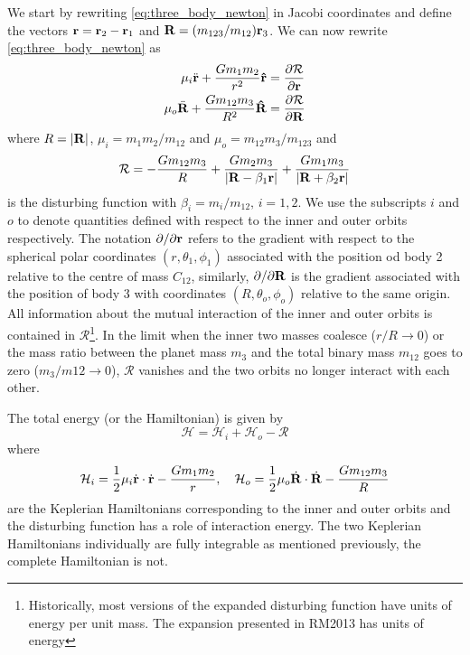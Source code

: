 \documentclass[twoside,openright,titlepage,numbers=noenddot,headinclude,%
                footinclude=true,cleardoublepage=empty,abstractoff, 
                BCOR=5mm,paper=a4,fontsize=11pt,%
                american,%
                ]{scrreprt}%
\begin{document}
We start by rewriting \cref{eq:three_body_newton} in Jacobi coordinates
and define the vectors $\boldsymbol{\mathbf{r}}=\boldsymbol{\mathbf{r}}_2-\boldsymbol{\mathbf{r}}_1$ and 
$\boldsymbol{\mathbf{R}}= (m_{123}/m_{12})\boldsymbol{\mathbf{r}}_3$.
We can now rewrite \cref{eq:three_body_newton} as
\begin{equation}
\begin{aligned}
    \mu_i\ddot{\boldsymbol{\mathbf{r}}}+ \frac{Gm_1m_2}{r^2} \boldsymbol{\mathbf{\hat r}}&= \frac{
        \partial \mathcal{R}}{\partial \boldsymbol{\mathbf{r}}} \\
    \mu_o\ddot{\boldsymbol{\mathbf{R}}}+ \frac{Gm_{12}m_3}{R^2} \boldsymbol{\mathbf{\hat R}}&= \frac{
        \partial \mathcal{R}}{\partial \boldsymbol{\mathbf{R}}} 
    \label{eq:three_body_newton_R}
\end{aligned}
\end{equation}
where $R=\lvert\boldsymbol{\mathbf{R}}\rvert$, $\mu_i=m_1m_2/m_{12}$ and $\mu_o=m_{12}m_3/m_{123}$
and
\begin{equation}
    \mathcal{R}=- \frac{Gm_{12}m_3}{R} + \frac{Gm_2m_3}{\lvert\boldsymbol{\mathbf{R}}-\beta_1\boldsymbol{\mathbf{r}}
    \rvert} + \frac{Gm_1m_3}{\lvert\boldsymbol{\mathbf{R}}+\beta_2\boldsymbol{\mathbf{r}}\rvert}
    \label{eq:dist_cartesian}
\end{equation}
is the disturbing function with $\beta_i=m_i/m_{12},\,i=1,2$. We use the subscripts
$i$ and $o$ to denote quantities defined with respect to the inner and outer orbits
respectively. The notation $\partial/\partial\boldsymbol{\mathbf{r}}$ refers to the gradient with 
respect to the spherical polar coordinates $(r,\theta_1,\phi_1)$ 
associated with the position od body 2 relative to the centre of mass $C_{12}$, similarly,
$\partial/\partial\boldsymbol{\mathbf{R}}$ is the gradient associated with the position 
of body 3 with coordinates $(R,\theta_o,\phi_o)$
relative to the same origin. All information
about the mutual interaction of the inner and outer orbits is contained in
$\mathcal{R}$\footnote{Historically, most versions of the expanded disturbing
function have units of energy per unit mass. The expansion presented in RM2013 has
units of energy}. In the limit when the inner two masses coalesce ($r/R\rightarrow 0$)
or the mass ratio between the planet mass $m_3$ and the total binary mass $m_{12}$
goes to zero ($m_3/m{12}\rightarrow 0$), $\mathcal{R}$ vanishes and the two orbits
no longer interact with each other. 

The total energy (or the Hamiltonian) is given by
\begin{equation}
    \mathcal{H}=\mathcal{H}_i+\mathcal{H}_o-\mathcal{R}
    \label{eq:three_body_hamiltonian}
\end{equation}
where
\begin{equation}
    \mathcal{H}_i= \frac{1}{2}\mu_i\dot{\boldsymbol{\mathbf{r}}}\cdot\dot{\boldsymbol{\mathbf{r}}}- \frac{Gm_1m_2}{r}, \quad
    \mathcal{H}_o= \frac{1}{2}\mu_o\dot{\boldsymbol{\mathbf{R}}}\cdot\dot{\boldsymbol{\mathbf{R}}}- \frac{Gm_{12}m_3}{R}
\end{equation}
are the Keplerian Hamiltonians corresponding to the inner and outer orbits and the 
disturbing function has a role of interaction energy. The two Keplerian Hamiltonians
individually are fully integrable as mentioned previously, the complete Hamiltonian
is not. 
\end{document}
